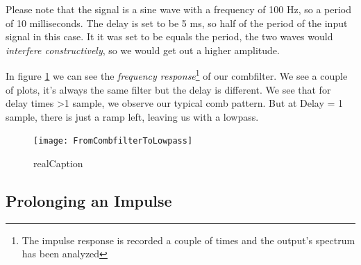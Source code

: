 Please note that the signal is a sine wave with a frequency of 100 Hz, so a period of 10 milliseconds. The delay is set to be 5 ms, so half of the period of the input signal in this case. It it was set to be equals the period, the two waves would \textit{interfere constructively}, so we would get out a higher amplitude. \\


In figure \ref{fig:combToLowpass} we can see the \textit{frequency response}\footnote{The impulse response is recorded a couple of times and the output's spectrum has been analyzed} of our combfilter. We see a couple of plots, it's always the same filter but the delay is different. We see that for delay times >1 sample, we observe our typical comb pattern. But at Delay = 1 sample, there is just a ramp left, leaving us with a lowpass.

\begin{figure}[H]
	\centering
	\texttt{[image: FromCombfilterToLowpass]}
	\caption[shortCaption]
	{realCaption}
	\label{fig:combToLowpass}
\end{figure}

\subsection{Prolonging an Impulse}












